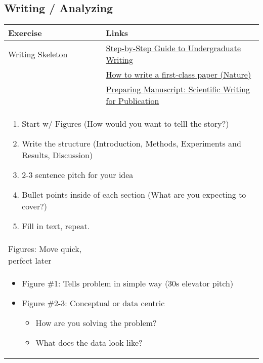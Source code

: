 \newpage

\subsection{Writing / Analyzing}
\begin{summary}
    \begin{center}
        \begin{tabular}{ll}
            \toprule
            \textbf{Exercise} & \textbf{Links} \\
            \toprule
            Writing Skeleton & \href{https://esajournals.onlinelibrary.wiley.com/doi/full/10.1002/bes2.1258}{Step-by-Step Guide to Undergraduate Writing} \\
            & \href{https://www.nature.com/articles/d41586-018-02404-4}{How to write a first-class paper (Nature)} \\
            & \href{https://www.ncbi.nlm.nih.gov/pmc/articles/PMC5037950/}{Preparing Manuscript: Scientific Writing for Publication} \\
            \multicolumn{2}{p{\linewidth}}{
            \begin{enumerate}
                \item Start w/ Figures (How would you want to telll the story?)
                \item Write the structure (Introduction, Methods, Experiments and Results, Discussion)
                \item 2-3 sentence pitch for your idea
                \item Bullet points inside of each section (What are you expecting to cover?)
                \item Fill in text, repeat.
            \end{enumerate}} \\
            \midrule
            Figures: Move quick, perfect later & \\
            \multicolumn{2}{p{\linewidth}}{
            \begin{itemize}
                \item Figure \#1: Tells problem in simple way (30s elevator pitch)
                \item Figure \#2-3: Conceptual or data centric
                \begin{itemize}
                    \item How are you solving the problem?
                    \item What does the data look like?

\end{itemize}
\end{itemize}}
\end{tabular}
\end{center}
\end{summary}

